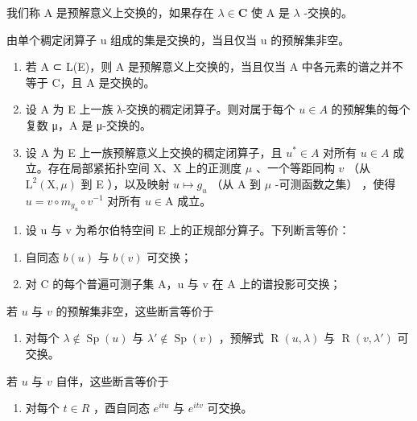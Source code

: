 我们称 A 是预解意义上交换的，如果存在 \(\lambda \in \mathbf{C}\) 使 A 是 \(\lambda\) -交换的。

由单个稠定闭算子 u 组成的集是交换的，当且仅当 u 的预解集非空。

\begin{enumerate}
\def\labelenumi{\alph{enumi})}
\item
  若 A ⊂ L(E)，则 A 是预解意义上交换的，当且仅当 A 中各元素的谱之并不等于 C，且 A 是交换的。
\item
  设 A 为 E 上一族 λ-交换的稠定闭算子。则对属于每个 \(u \in A\) 的预解集的每个复数 μ，A 是 μ-交换的。
\item
  设 A 为 E 上一族预解意义上交换的稠定闭算子，且 \(u^{*} \in A\) 对所有 \(u \in A\) 成立。存在局部紧拓扑空间 X、X 上的正测度 \(\mu\) 、一个等距同构 \(v\) （从 \(\mathrm{L}^2 (\mathrm{X},\mu)\) 到 E ），以及映射 \(u\mapsto g_u\) （从 A 到 \(\mu\) -可测函数之集） ，使得 \(u = v\circ m_{g_u}\circ v^{-1}\) 对所有 \(u\in \mathrm{A}\) 成立。
\end{enumerate}

\begin{enumerate}
\def\labelenumi{\arabic{enumi})}
\setcounter{enumi}{7}
\tightlist
\item
  设 u 与 v 为希尔伯特空间 E 上的正规部分算子。下列断言等价：
\end{enumerate}

\begin{enumerate}
\def\labelenumi{\alph{enumi})}
\item
  自同态 \(b(u)\) 与 \(b(v)\) 可交换；
\item
  对 C 的每个普遍可测子集 A，u 与 v 在 A 上的谱投影可交换；
\end{enumerate}

若 \(u\) 与 \(v\) 的预解集非空，这些断言等价于

\begin{enumerate}
\def\labelenumi{\alph{enumi})}
\setcounter{enumi}{2}
\tightlist
\item
  对每个 \(\lambda \notin \operatorname{Sp}(u)\) 与 \(\lambda' \notin \operatorname{Sp}(v)\) ，预解式 \(\operatorname{R}(u, \lambda)\) 与 \(\operatorname{R}(v, \lambda')\) 可交换。
\end{enumerate}

若 \(u\) 与 \(v\) 自伴，这些断言等价于

\begin{enumerate}
\def\labelenumi{\alph{enumi})}
\setcounter{enumi}{3}
\tightlist
\item
  对每个 \(t \in R\) ，酉自同态 \(e^{itu}\) 与 \(e^{itv}\) 可交换。
\end{enumerate}

